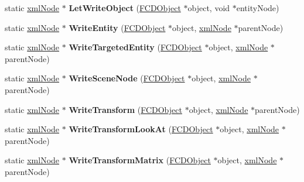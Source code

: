 \begin{DoxyCompactItemize}
\item 
\hypertarget{classFArchiveXML_a069847f89d00cb2b3e20f2f27933d755}{
static \hyperlink{struct__xmlNode}{xmlNode} $\ast$ {\bfseries LetWriteObject} (\hyperlink{classFCDObject}{FCDObject} $\ast$object, void $\ast$entityNode)}
\label{classFArchiveXML_a069847f89d00cb2b3e20f2f27933d755}

\item 
\hypertarget{classFArchiveXML_a807a0857dcb5d4fe348010a1f10bfa02}{
static \hyperlink{struct__xmlNode}{xmlNode} $\ast$ {\bfseries WriteEntity} (\hyperlink{classFCDObject}{FCDObject} $\ast$object, \hyperlink{struct__xmlNode}{xmlNode} $\ast$parentNode)}
\label{classFArchiveXML_a807a0857dcb5d4fe348010a1f10bfa02}

\item 
\hypertarget{classFArchiveXML_a32954c23bd8602eee6aa0a8a64334923}{
static \hyperlink{struct__xmlNode}{xmlNode} $\ast$ {\bfseries WriteTargetedEntity} (\hyperlink{classFCDObject}{FCDObject} $\ast$object, \hyperlink{struct__xmlNode}{xmlNode} $\ast$parentNode)}
\label{classFArchiveXML_a32954c23bd8602eee6aa0a8a64334923}

\item 
\hypertarget{classFArchiveXML_a2ddd4c06e787a167f3f5797db1a43216}{
static \hyperlink{struct__xmlNode}{xmlNode} $\ast$ {\bfseries WriteSceneNode} (\hyperlink{classFCDObject}{FCDObject} $\ast$object, \hyperlink{struct__xmlNode}{xmlNode} $\ast$parentNode)}
\label{classFArchiveXML_a2ddd4c06e787a167f3f5797db1a43216}

\item 
\hypertarget{classFArchiveXML_a7a3d7ea3aec2b18562bf0203a56af303}{
static \hyperlink{struct__xmlNode}{xmlNode} $\ast$ {\bfseries WriteTransform} (\hyperlink{classFCDObject}{FCDObject} $\ast$object, \hyperlink{struct__xmlNode}{xmlNode} $\ast$parentNode)}
\label{classFArchiveXML_a7a3d7ea3aec2b18562bf0203a56af303}

\item 
\hypertarget{classFArchiveXML_a32ce577d0c71a7f753a03fcfb139449e}{
static \hyperlink{struct__xmlNode}{xmlNode} $\ast$ {\bfseries WriteTransformLookAt} (\hyperlink{classFCDObject}{FCDObject} $\ast$object, \hyperlink{struct__xmlNode}{xmlNode} $\ast$parentNode)}
\label{classFArchiveXML_a32ce577d0c71a7f753a03fcfb139449e}

\item 
\hypertarget{classFArchiveXML_aedf251f66e2ab6dc68d8041c4ac7a754}{
static \hyperlink{struct__xmlNode}{xmlNode} $\ast$ {\bfseries WriteTransformMatrix} (\hyperlink{classFCDObject}{FCDObject} $\ast$object, \hyperlink{struct__xmlNode}{xmlNode} $\ast$parentNode)}
\label{classFArchiveXML_aedf251f66e2ab6dc68d8041c4ac7a754}


\end{DoxyCompactItemize}
